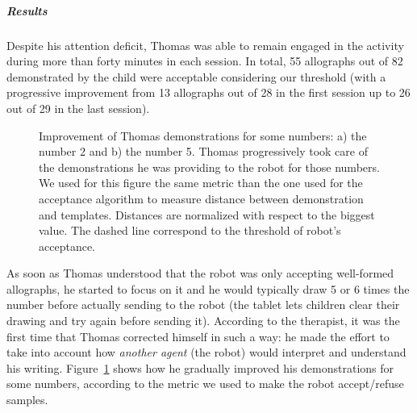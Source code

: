 \documentclass[10pt,a4paper]{article}
\begin{document}
\subparagraph{Results}
Despite his attention deficit, Thomas was able to remain engaged in the activity during more than
forty minutes in each session. In total, 55 allographs out of 82 
demonstrated by the child were acceptable considering our threshold (with a
progressive improvement from 13 allographs out of 28 in the first session up to 26 out
of 29 in the last session).

\begin{figure}[!]
    \centering
    \caption{\small Improvement of Thomas demonstrations for some numbers: a) the number 2 and b) the number 5. Thomas progressively took care of the demonstrations he was providing to the robot for those numbers. We used for this figure the same metric than the one used for the acceptance algorithm to measure distance between demonstration and templates. Distances are normalized with respect to the biggest value. The dashed line correspond to the threshold of robot's acceptance.}
    \label{Thomas_progress}
\end{figure}

As soon as Thomas understood that the robot was only accepting well-formed
allographs, he started to focus on it and he would typically draw 5 or 6 times
the number before actually sending to the robot (the tablet lets children
clear their drawing and try again before sending it). According to
the therapist, it was the first time that Thomas corrected himself in such a
way: he made the effort to take into account how \emph{another agent} (the robot) would
interpret and understand his writing. Figure~\ref{Thomas_progress} shows how
he gradually improved his demonstrations for some numbers, according to the
metric we used to make the robot accept/refuse samples.
\end{document}

